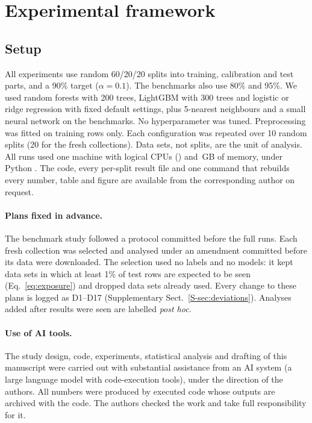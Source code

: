 \section{Experimental framework}\label{sec:framework}

\subsection{Setup}
All experiments use random 60/20/20 splits into training, calibration and test parts, and a 90\% target ($\alpha=0.1$). The benchmarks also use 80\% and 95\%. We used random forests \citep{breiman2001} with 200 trees, LightGBM \citep{ke2017} with 300 trees and logistic or ridge regression with fixed default settings, plus 5-nearest neighbours and a small neural network on the benchmarks. No hyperparameter was tuned. Preprocessing was fitted on training rows only. Each configuration was repeated over 10 random splits (20 for the fresh collections). Data sets, not splits, are the unit of analysis. All runs used one machine with \NHwNcpu{} logical CPUs (\NHwCpu{}) and \NHwRam{}\,GB of memory, under Python \NHwPython{}. The code, every per-split result file and one command that rebuilds every number, table and figure are available from the corresponding author on request.

\paragraph{Plans fixed in advance.} The benchmark study followed a protocol committed before the full runs. Each fresh collection was selected and analysed under an amendment committed before its data were downloaded. The selection used no labels and no models: it kept data sets in which at least 1\% of test rows are expected to be seen (Eq.~\ref{eq:exposure}) and dropped data sets already used. Every change to these plans is logged as D1--D17 (Supplementary Sect.~\ref{S-sec:deviations}). Analyses added after results were seen are labelled \emph{post hoc}.

\paragraph{Use of AI tools.} The study design, code, experiments, statistical analysis and drafting of this manuscript were carried out with substantial assistance from an AI system (a large language model with code-execution tools), under the direction of the authors. All numbers were produced by executed code whose outputs are archived with the code. The authors checked the work and take full responsibility for it.

